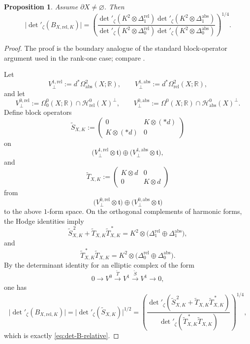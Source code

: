 \documentclass[12pt]{amsart}
\numberwithin{equation}{section}
\newtheorem{prop}[theorem]{Proposition}
\begin{document}
\begin{prop}
\label{prop:det-B-relative}
Assume \(\partial X\neq\varnothing\). Then
\begin{equation}
\label{eq:det-B-relative}
\bigl|\det\nolimits'_{\zeta}(B_{X,\mathrm{rel},K})\bigr|
=
\left(
\frac{
\det\nolimits'_{\zeta}(K^2\otimes \Delta_1^{\mathrm{rel}})
\det\nolimits'_{\zeta}(K^2\otimes \Delta_1^{\mathrm{abs}})
}{
\det\nolimits'_{\zeta}(K^2\otimes \Delta_0^{\mathrm{rel}})
\det\nolimits'_{\zeta}(K^2\otimes \Delta_0^{\mathrm{abs}})
}
\right)^{1/4}.
\end{equation}
\end{prop}

\begin{proof}
The proof is the boundary analogue of the standard block-operator argument used in the
rank-one case; compare \cite[Eq.~(IV.2''-IV.3)]{Manoliu3}.

Let
\[
V^{1,\mathrm{rel}}_{\perp}:=d^*\Omega^2_{\mathrm{abs}}(X;\mathbb R),
\qquad
V^{1,\mathrm{abs}}_{\perp}:=d^*\Omega^2_{\mathrm{rel}}(X;\mathbb R),
\]
and let
\[
V^{0,\mathrm{rel}}_{\perp}:=\Omega^0_0(X;\mathbb R)\cap \mathcal H^0_{\mathrm{rel}}(X)^\perp,
\qquad
V^{0,\mathrm{abs}}_{\perp}:=\Omega^0(X;\mathbb R)\cap \mathcal H^0_{\mathrm{abs}}(X)^\perp.
\]
Define block operators
\[
\widetilde S_{X,K}
:=
\begin{pmatrix}
0 & K\otimes(*d)\\
K\otimes(*d) & 0
\end{pmatrix}
\]
on
\[
\bigl(V^{1,\mathrm{rel}}_{\perp}\otimes\mathfrak t\bigr)
\oplus
\bigl(V^{1,\mathrm{abs}}_{\perp}\otimes\mathfrak t\bigr),
\]
and
\[
\widetilde T_{X,K}
:=
\begin{pmatrix}
K\otimes d & 0\\
0 & K\otimes d
\end{pmatrix}
\]
from
\[
\bigl(V^{0,\mathrm{rel}}_{\perp}\otimes\mathfrak t\bigr)
\oplus
\bigl(V^{0,\mathrm{abs}}_{\perp}\otimes\mathfrak t\bigr)
\]
to the above \(1\)-form space. On the orthogonal complements of harmonic forms, the Hodge identities imply
\[
\widetilde S_{X,K}^{\,2}
+\widetilde T_{X,K}\widetilde T_{X,K}^{\,*}
=
K^2\otimes
\bigl(
\Delta_1^{\mathrm{rel}}\oplus \Delta_1^{\mathrm{abs}}
\bigr),
\]
and
\[
\widetilde T_{X,K}^{\,*}\widetilde T_{X,K}
=
K^2\otimes
\bigl(
\Delta_0^{\mathrm{rel}}\oplus \Delta_0^{\mathrm{abs}}
\bigr).
\]
By the determinant identity for an elliptic complex of the form
\[
0\longrightarrow V^0\xrightarrow{\widetilde T}V^1\xrightarrow{\widetilde S}V^1\longrightarrow 0,
\]
one has
\[
\bigl|\det\nolimits'_{\zeta}(B_{X,\mathrm{rel},K})\bigr|
=
\bigl|\det\nolimits'_{\zeta}(\widetilde S_{X,K})\bigr|^{1/2}
=
\left(
\frac{
\det\nolimits'_{\zeta}(\widetilde S_{X,K}^{\,2}+\widetilde T_{X,K}\widetilde T_{X,K}^{\,*})
}{
\det\nolimits'_{\zeta}(\widetilde T_{X,K}^{\,*}\widetilde T_{X,K})
}
\right)^{1/4},
\]
which is exactly \eqref{eq:det-B-relative}.
\end{proof}
\end{document}
